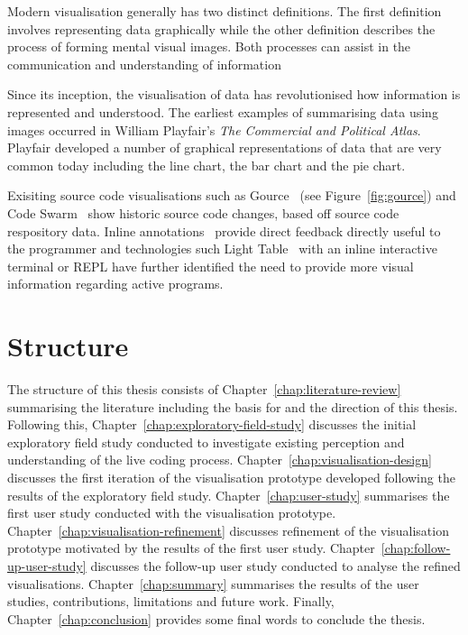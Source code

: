 Modern visualisation generally has two distinct definitions. The first definition involves representing data graphically while the other definition describes the process of forming mental visual images. {\color{red} Both processes can assist in the communication and understanding of information}

Since its inception, the visualisation of data has revolutionised how information is represented and understood. The earliest examples of summarising data using images occurred in William Playfair's \textit{The Commercial and Political Atlas}. Playfair developed a number of graphical representations of data that are very common today including the line chart, the bar chart and the pie chart.





Exisiting source code visualisations such as Gource~\cite{Caudwell2010} (see Figure~\ref{fig:gource}) and Code Swarm~\cite{Ogawa2012} show historic source code changes, based off source code respository data. Inline annotations~\cite{Swift2013} provide direct feedback directly useful to the programmer and technologies such Light Table~\cite{Kodowa2014} with an inline interactive terminal or \ac{REPL} have further identified the need to provide more visual information regarding active programs.

\section{Structure}

The structure of this thesis consists of Chapter~\ref{chap:literature-review} summarising the literature including the basis for and the direction of this thesis. Following this, Chapter~\ref{chap:exploratory-field-study} discusses the initial exploratory field study conducted to investigate existing perception and understanding of the live coding process. Chapter~\ref{chap:visualisation-design} discusses the first iteration of the visualisation prototype developed following the results of the exploratory field study. Chapter~\ref{chap:user-study} summarises the first user study conducted with the visualisation prototype. Chapter~\ref{chap:visualisation-refinement} discusses refinement of the visualisation prototype motivated by the results of the first user study. Chapter~\ref{chap:follow-up-user-study} discusses the follow-up user study conducted to analyse the refined visualisations. Chapter~\ref{chap:summary} summarises the results of the user studies, contributions, limitations and future work. Finally, Chapter~\ref{chap:conclusion} provides some final words to conclude the thesis.


